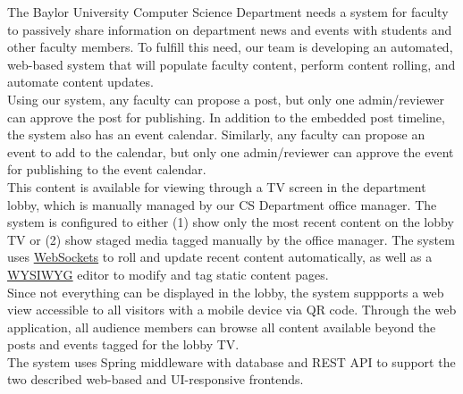 The Baylor University Computer Science Department needs a system for faculty to passively share information on department news and events with students and other faculty members. To fulfill this need, our team is developing an automated, web-based system that will populate faculty content, perform content rolling, and automate content updates. \\

Using our system, any faculty can propose a post, but only one admin/reviewer can approve the post for publishing. In addition to the embedded post timeline, the system also has an event calendar. Similarly, any faculty can propose an event to add to the calendar, but only one admin/reviewer can approve the event for publishing to the event calendar. \\

This content is available for viewing through a TV screen in the department lobby, which is manually managed by our CS Department office manager. The system is configured to either (1) show only the most recent content on the lobby TV or (2) show staged media tagged manually by the office manager. The system uses \hyperref[sec:Glossary]{WebSockets} to roll and update recent content automatically, as well as a \hyperref[sec:Glossary]{WYSIWYG} editor to modify and tag static content pages. \\

Since not everything can be displayed in the lobby, the system suppports a web view accessible to all visitors with a mobile device via QR code. Through the web application, all audience members can browse all content available beyond the posts and events tagged for the lobby TV. \\

The system uses Spring middleware with database and REST API to support the two described web-based and UI-responsive frontends. \\